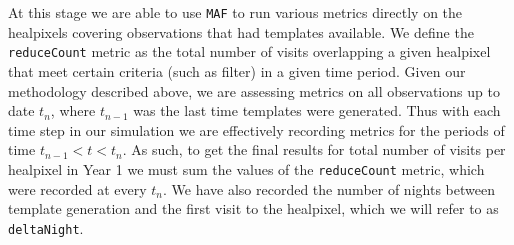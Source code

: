 \documentclass[preprintm,linenumbers]{aastex631}
\newcommand{\deltaNight}{\texttt{deltaNight}\xspace}
\newcommand{\reduceCount}{\texttt{reduceCount}\xspace}
\newcommand{\maf}{\texttt{MAF}\xspace}
\begin{document}
		At this stage we are able to use \maf to run various metrics directly on the healpixels covering observations that had templates available. 
We define the \reduceCount metric as the total number of visits overlapping a given healpixel that meet certain criteria (such as filter) in a given time period.
Given our methodology described above, we are assessing metrics on all observations up to date $t_n$, where $t_{n-1}$ was the last time templates were generated.
Thus with each time step in our simulation we are effectively recording metrics for the periods of time $t_{n-1} < t < t_{n}$.
As such, to get the final results for total number of visits per healpixel in Year 1 we must sum the values of the \reduceCount metric, which were recorded at every $t_n$.
We have also recorded the number of nights between template generation and the first visit to the healpixel, which we will refer to as \deltaNight.
		
\end{document}
